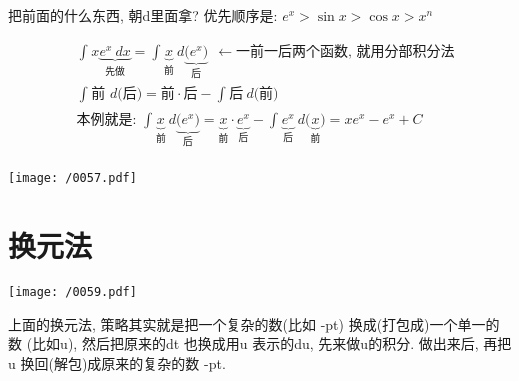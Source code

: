 \documentclass[UTF8]{ctexart}
\begin{document}
	把前面的什么东西, 朝d里面拿? 优先顺序是: $e^x  > \sin x > \cos x > x^n$ \\
	
	\begin{myEnvSample}
		\begin{align*}
	&\int_{}^{}{x\underset{\text{先做}}{\underbrace{e^x\ dx}}}=\int_{}^{}{\underset{\text{前}}{\underbrace{x}}}\ d\underset{\text{后}}{\underbrace{\text{(}e^x\text{)}}}\ \ \gets \text{一前一后两个函数,\ 就用分部积分法}\\
&\int_{}^{}{\text{前\ }d\text{(后)}}=\text{前}\cdot \text{后}-\int_{}^{}{\text{后}}\ d\text{(前)}\\
&\text{本例就是:\ }\int_{}^{}{\underset{\text{前}}{\underbrace{x}}}\ d\underset{\text{后}}{\underbrace{\text{(}e^x\text{)}}}=\underset{\text{前}}{\underbrace{x}}\cdot \underset{\text{后}}{\underbrace{e^x}}-\int_{}^{}{\underset{\text{后}}{\underbrace{e^x}}\ d\text{(}\underset{\text{前}}{\underbrace{x}}\text{)}}=xe^x-e^x+C\\
		\end{align*}
	\end{myEnvSample}
	
	
	\begin{myEnvSample}
\texttt{[image: /0057.pdf]}
	\end{myEnvSample}
	
	
	
	
	
	
	
	\section{换元法}
	
	\begin{myEnvSample}
	\texttt{[image: /0059.pdf]}
	\end{myEnvSample}

	上面的换元法, 策略其实就是把一个复杂的数(比如 -pt) 换成(打包成)一个单一的数 (比如u), 然后把原来的dt 也换成用u 表示的du, 先来做u的积分. 做出来后, 再把u 换回(解包)成原来的复杂的数 -pt.
	
	



	
	
	
	
	
	
	
\end{document}
